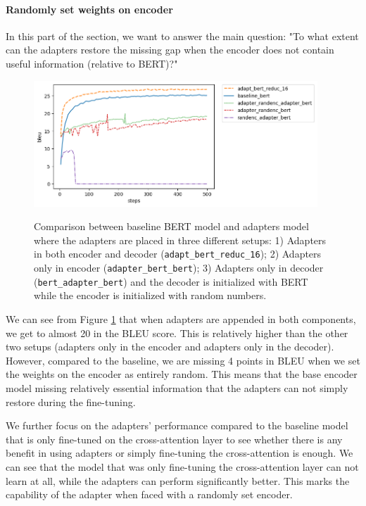 \paragraph{Randomly set weights on encoder}
In this part of the section, we want to answer the main question: "To what extent can the adapters restore the missing gap when the encoder does not contain useful information (relative to BERT)?"

\begin{figure}[h]
    {\includegraphics[width=0.95\textwidth]{img/adapter_bert_randenc.png}}
    \centering
    \caption{Comparison between baseline BERT model and adapters model where the adapters are placed in three different setups: 1) Adapters in both encoder and decoder (\texttt{adapt\_bert\_reduc\_16}); 2) Adapters only in encoder (\texttt{adapter\_bert\_bert}); 3) Adapters only in decoder (\texttt{bert\_adapter\_bert}) and the decoder is initialized with BERT while the encoder is initialized with random numbers.}
    \label{img:adapt_bert_randenc}
\end{figure}

We can see from Figure \ref{img:adapt_bert_randenc} that when adapters are appended in both components, we get to almost 20 in the BLEU score. This is relatively higher than the other two setups (adapters only in the encoder and adapters only in the decoder). However, compared to the baseline, we are missing 4 points in BLEU when we set the weights on the encoder as entirely random. This means that the base encoder model missing relatively essential information that the adapters can not simply restore during the fine-tuning.

We further focus on the adapters' performance compared to the baseline model that is only fine-tuned on the cross-attention layer to see whether there is any benefit in using adapters or simply fine-tuning the cross-attention is enough. We can see that the model that was only fine-tuning the cross-attention layer can not learn at all, while the adapters can perform significantly better. This marks the capability of the adapter when faced with a randomly set encoder.

